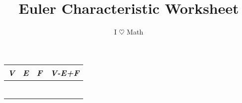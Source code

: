 \documentclass[20pt]{extarticle}
\title{Euler Characteristic Worksheet}
\author{I $\heartsuit$ Math}
\date{}
\begin{document}

\Huge
\begin{center}
\begin{tabular}{c|c|c|c}
\it V & \it E & \it F & \it V-E+F \\ \hline
\phantom{MMM} & \phantom{MMM} & \phantom{MMM} & \phantom{MMM} \\
\phantom{MMM} & \phantom{MMM} & \phantom{MMM} & \phantom{MMM} \\
\phantom{MMM} & \phantom{MMM} & \phantom{MMM} & \phantom{MMM} \\
\phantom{MMM} & \phantom{MMM} & \phantom{MMM} & \phantom{MMM} \\
\phantom{MMM} & \phantom{MMM} & \phantom{MMM} & \phantom{MMM} \\
\phantom{MMM} & \phantom{MMM} & \phantom{MMM} & \phantom{MMM} \\
\end{tabular}
\end{center}
\end{document}
